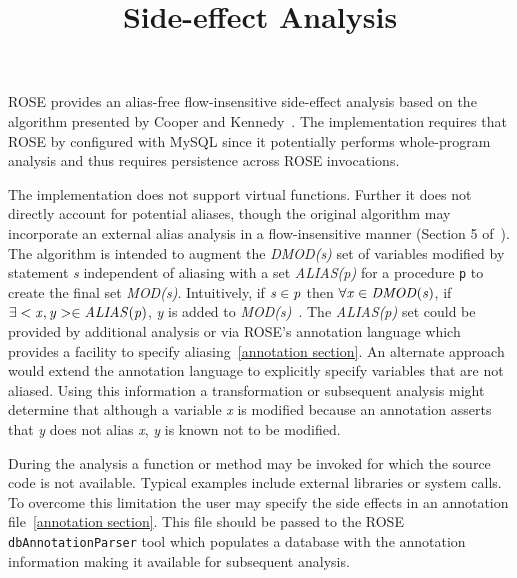 \documentclass[times, 10pt]{article}
\title{Side-effect Analysis}
\begin{document}
\date{}

\maketitle


ROSE provides an alias-free flow-insensitive side-effect analysis
based on the algorithm presented by Cooper and Kennedy~\cite{cooper+:pldi88}.
The implementation requires that ROSE by configured with MySQL since
it potentially performs whole-program analysis and thus requires
persistence across ROSE invocations.

The implementation does not support virtual functions.  Further it
does not directly account for potential aliases, though the original
algorithm may incorporate an external alias analysis in a flow-insensitive
manner (Section 5 of~\cite{cooper+:pldi88}).  The algorithm is
intended to augment the {\it DMOD(s)} set of variables modified by
statement {\it s} independent of aliasing with a set {\it ALIAS(p)}
for a procedure {\tt p} to create the final set {\it MOD(s)}.  
Intuitively, if ${\it s \in p}$ then 
${\it \forall x \in DMOD(s)}$, if ${\it \exists <x,y> \in ALIAS(p)}$,
{\it y} is added to {\it MOD(s)}~\cite{cooper+:pldi88}.  The
{\it ALIAS(p)} set could be provided by additional analysis or via
ROSE's annotation language which provides a facility to
specify aliasing~\ref{annotation section}.  An alternate approach
would extend the annotation language to explicitly specify variables
that are not aliased.  Using this information a transformation or
subsequent analysis might determine that although a variable {\it x}
is modified because an annotation asserts that {\it y} does not alias {\it x},
{\it y} is known not to be modified.

During the analysis a function or method may be invoked for which
the source code is not available.  Typical examples include
external libraries or system calls.  To overcome this limitation
the user may specify the side effects in an annotation 
file~\ref{annotation section}.  This file should be passed to
the ROSE {\tt dbAnnotationParser} tool which populates a database
with the annotation information making it available for subsequent
analysis.
\end{document}
